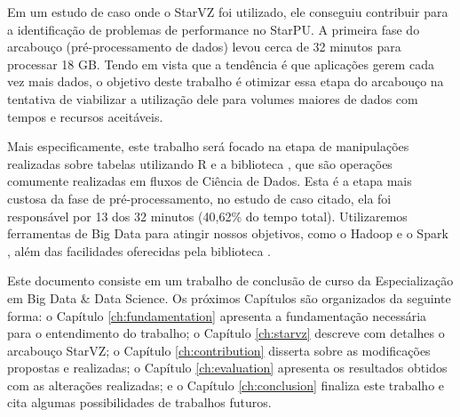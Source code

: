 Em um estudo de caso onde o StarVZ foi utilizado, ele conseguiu contribuir para 
a identificação de problemas de performance no StarPU. A primeira fase do 
arcabouço (pré-processamento de dados) levou cerca de 32 minutos para processar 
18 GB. Tendo em vista que a tendência é que aplicações gerem cada vez mais 
dados, o objetivo deste trabalho é otimizar essa etapa do arcabouço na tentativa 
de viabilizar a utilização dele para volumes maiores de dados com tempos e 
recursos aceitáveis.

Mais especificamente, este trabalho será focado na etapa de manipulações 
realizadas sobre tabelas utilizando R e a biblioteca , 
que são operações comumente realizadas em fluxos de Ciência de Dados. Esta 
é a etapa mais custosa da fase de pré-processamento, no estudo de caso citado, 
ela foi responsável por 13 dos 32 minutos (40,62\% do tempo total). 
Utilizaremos ferramentas de Big Data para atingir nossos objetivos, como o 
Hadoop \cite{ref:hadoopbook} e o Spark \cite{ref:sparkbook}, além das 
facilidades oferecidas pela biblioteca . 

Este documento consiste em um trabalho de conclusão de curso da Especialização 
em Big Data \& Data Science. Os próximos Capítulos são organizados da seguinte 
forma: o Capítulo \ref{ch:fundamentation} apresenta a fundamentação necessária 
para o entendimento do trabalho; o Capítulo \ref{ch:starvz} descreve com 
detalhes o arcabouço StarVZ; o Capítulo \ref{ch:contribution} disserta sobre as 
modificações propostas e realizadas; o Capítulo \ref{ch:evaluation} apresenta 
os resultados obtidos com as alterações realizadas; e o Capítulo 
\ref{ch:conclusion} finaliza este trabalho e cita algumas possibilidades de 
trabalhos futuros.
